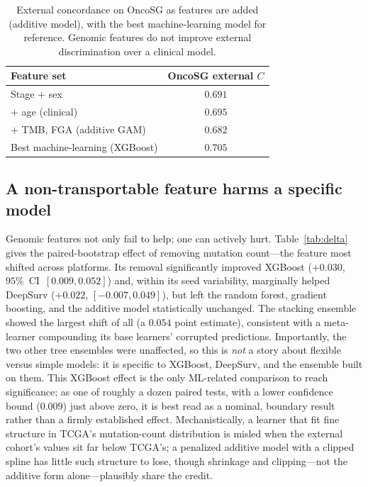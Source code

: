 \documentclass[journal]{IEEEtran}
\begin{document}
\begin{table}[t]
\caption{External concordance on OncoSG as features are added (additive model),
with the best machine-learning model for reference. Genomic features do not
improve external discrimination over a clinical model.}
\label{tab:ladder}
\centering
\begin{tabular}{lc}
\toprule
Feature set & OncoSG external $C$ \\
\midrule
Stage $+$ sex                      & $0.691$ \\
$+$ age (clinical)                 & $0.695$ \\
$+$ TMB, FGA (additive GAM)        & $0.682$ \\
\midrule
Best machine-learning (XGBoost)    & $0.705$ \\
\bottomrule
\end{tabular}
\end{table}

\subsection{A non-transportable feature harms a specific model}
Genomic features not only fail to help; one can actively hurt. Table~\ref{tab:delta}
gives the paired-bootstrap effect of removing mutation count---the feature most
shifted across platforms. Its removal significantly improved XGBoost
($+0.030$, $95\%$~CI~$[0.009,0.052]$) and, within its seed variability,
marginally helped DeepSurv ($+0.022$, $[-0.007,0.049]$), but left the random
forest, gradient boosting, and the additive model statistically unchanged. The stacking ensemble showed the
largest shift of all (a $0.054$ point estimate), consistent with a meta-learner
compounding its base learners' corrupted predictions. Importantly, the two other
tree ensembles were unaffected, so this is \emph{not} a story about flexible
versus simple models: it is specific to XGBoost, DeepSurv, and the ensemble
built on them. This XGBoost effect is the only ML-related comparison to reach
significance; as one of roughly a dozen paired tests, with a lower confidence
bound ($0.009$) just above zero, it is best read as a nominal, boundary result
rather than a firmly established effect. Mechanistically, a learner that fit
fine structure in TCGA's
mutation-count distribution is misled when the external cohort's values sit far
below TCGA's; a penalized additive model with a clipped spline has little such
structure to lose, though shrinkage and clipping---not the additive form
alone---plausibly share the credit.
\end{document}
